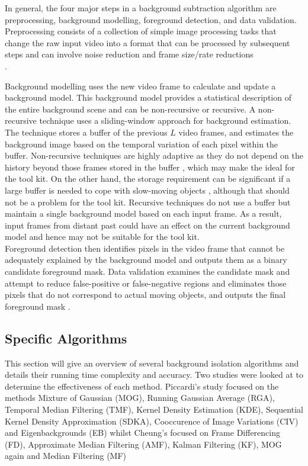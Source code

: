 In general, the four major steps in a background subtraction algorithm are preprocessing, background modelling, foreground detection, and data validation.
Preprocessing consists of a collection of simple image processing tasks that change the raw input video into a format that can be processed by subsequent steps and can involve noise reduction and frame size/rate reductions \cite{Cheung2007}\\.

Background modelling uses the new video frame to calculate and update a background model.
This background model provides a statistical description of the entire background scene and can be non-recursive or recursive. 
A non-recursive technique uses a sliding-window approach for background estimation. 
The technique stores a buffer of the previous $L$ video frames, and estimates the background image based on the temporal variation of each pixel within the buffer.
Non-recursive techniques are highly adaptive as they do not depend on the history beyond those frames stored in the buffer \cite{Cheung2007}, which may make the ideal for the tool kit.
On the other hand, the storage requirement can be significant if a large buffer
is needed to cope with slow-moving objects \cite{Cheung2007}, although that should not be a problem for the tool kit. Recursive techniques do not use a buffer but maintain a single background model based on each input frame. As a result, input frames from distant past could have an effect on the current background model \cite{Cheung2007} and hence may not be suitable for the tool kit.\\

Foreground detection then identifies pixels in the video frame that cannot be adequately explained by the background model and outputs them as a binary candidate foreground mask. 
Data validation examines the candidate mask and attempt to reduce false-positive or false-negative regions and eliminates those pixels that do not correspond to actual moving objects, and outputs the final foreground mask \cite{Cheung2007}.\\

\subsection{Specific Algorithms}
This section will give an overview of several background isolation algorithms and details their running time complexity and accuracy. Two studies were looked at to determine the effectiveness of each method. Piccardi's study \cite{Piccardi2004} focused on the methods Mixture of Gaussian (MOG), Running Gaussian Average (RGA), Temporal Median Filtering (TMF), Kernel Density Estimation (KDE), Sequential Kernel Density Approximation (SDKA), Cooccurence of Image Variations (CIV) and Eigenbackgrounds (EB) whilst Cheung's \cite{Cheung2007} focused on Frame Differencing (FD), Approximate Median Filtering (AMF), Kalman Filtering (KF), MOG again and Median Filtering (MF) \\

